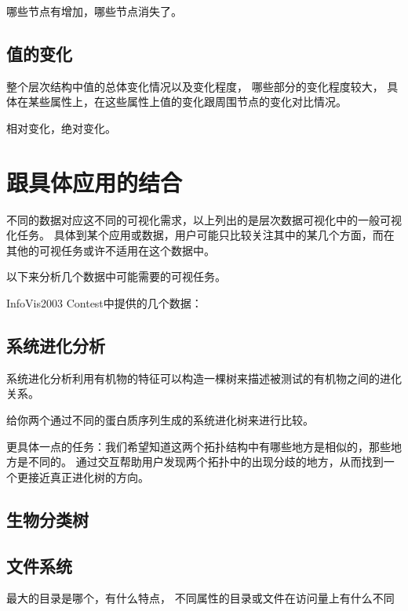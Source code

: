 \documentclass{article}
\begin{document}
哪些节点有增加，哪些节点消失了。

\subsection{值的变化}

整个层次结构中值的总体变化情况以及变化程度，
哪些部分的变化程度较大，
具体在某些属性上，在这些属性上值的变化跟周围节点的变化对比情况。

相对变化，绝对变化。

\section{跟具体应用的结合}

不同的数据对应这不同的可视化需求，以上列出的是层次数据可视化中的一般可视化任务。
具体到某个应用或数据，用户可能只比较关注其中的某几个方面，而在其他的可视任务或许不适用在这个数据中。

以下来分析几个数据中可能需要的可视任务。

InfoVis2003 Contest中提供的几个数据：

\subsection{系统进化分析}

系统进化分析利用有机物的特征可以构造一棵树来描述被测试的有机物之间的进化关系。

给你两个通过不同的蛋白质序列生成的系统进化树来进行比较。

更具体一点的任务：我们希望知道这两个拓扑结构中有哪些地方是相似的，那些地方是不同的。
通过交互帮助用户发现两个拓扑中的出现分歧的地方，从而找到一个更接近真正进化树的方向。

\subsection{生物分类树}

\subsection{文件系统}

最大的目录是哪个，有什么特点，
不同属性的目录或文件在访问量上有什么不同




\end{document}
